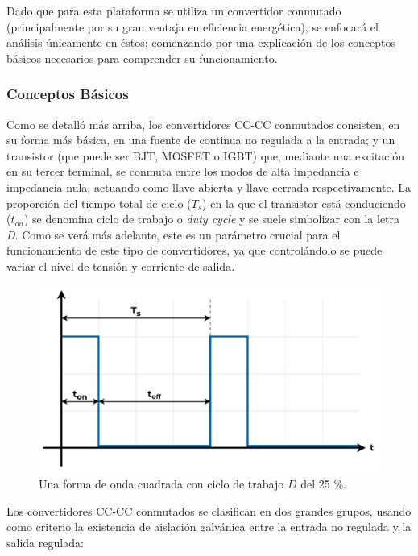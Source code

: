 Dado que para esta plataforma se utiliza un convertidor conmutado (principalmente por su gran ventaja en eficiencia energética), se enfocará el análisis únicamente en éstos; comenzando por una explicación de los conceptos básicos necesarios para comprender su funcionamiento.\\

\subsubsection{Conceptos Básicos}

Como se detalló más arriba, los convertidores CC-CC conmutados consisten, en su forma más básica, en una fuente de continua no regulada a la entrada; y un transistor (que puede ser BJT, MOSFET o IGBT) que, mediante una excitación en su tercer terminal, se conmuta entre los modos de alta impedancia e impedancia nula, actuando como llave abierta y llave cerrada respectivamente. La proporción del tiempo total de ciclo ($T_s$) en la que el transistor está conduciendo ($t_{on}$) se denomina {\Medium ciclo de trabajo} o {\Medium \textit{duty cycle}} y se suele simbolizar con la {\Medium letra \textit{D}}. Como se verá más adelante, este es un parámetro crucial para el funcionamiento de este tipo de convertidores, ya que controlándolo se puede variar el nivel de tensión y corriente de salida.

\begin{figure}[H]
    \centering
    \includegraphics[scale=0.5]{Imagenes/Duty Cycle.pdf}
    \caption{Una forma de onda cuadrada con ciclo de trabajo $D$ del 25 \%.}
    \label{dutycycle}
\end{figure}

Los convertidores CC-CC conmutados se clasifican en dos grandes grupos, usando como criterio la existencia de aislación galvánica entre la entrada no regulada y la salida regulada:

